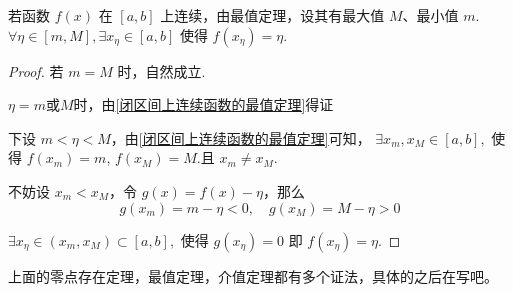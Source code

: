 \begin{proposition}
	若函数 \( f(x) \) 在 \([a, b]\) 上连续，由最值定理，设其有最大值 \( M \)、最小值 \( m \).
	\(\forall \eta \in [m, M], \exists x_\eta \in [a, b]\) 使得 \( f(x_\eta) = \eta \).
	
	
\end{proposition}
\begin{proof}
	若 \( m = M \) 时，自然成立.
	
	$\eta=m\text{或}M$时，由\ref{闭区间上连续函数的最值定理}得证
	
	下设 \( m < \eta < M \)，由\ref{闭区间上连续函数的最值定理}可知，
	\(\exists x_m, x_M \in [a, b], \) 使得 \( f(x_m) = m \), \( f(x_M) = M \).且 \( x_m \neq x_M \).
	
	不妨设 \( x_m < x_M \)，令 \( g(x) = f(x) - \eta \)，那么
	\[ g(x_m) = m - \eta < 0, \quad g(x_M) = M - \eta > 0 \]
	
	\(\exists x_\eta \in (x_m, x_M) \subset [a, b], \) 使得 \( g(x_\eta) = 0 \) 即 \( f(x_\eta) = \eta \).
	
\end{proof}
上面的零点存在定理，最值定理，介值定理都有多个证法，具体的之后在写吧。
